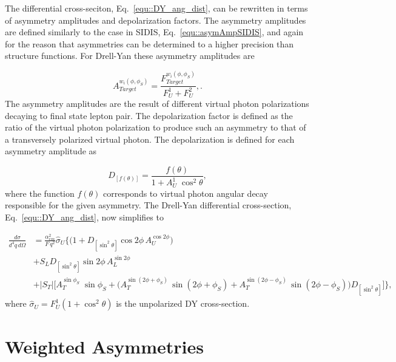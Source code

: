 The differential cross-seciton, Eq.~\ref{equ::DY_ang_dist}, can be rewritten in
terms of asymmetry amplitudes and depolarization factors.  The asymmetry
amplitudes are defined similarly to the case in SIDIS,
Eq.~\ref{equ::asymAmpSIDIS}, and again for the reason that asymmetries can be
determined to a higher precision than structure functions.  For Drell-Yan these
asymmetry amplitudes are

\begin{equation}
  A^{w_i(\phi, \phi_S)}_{Target} = \frac{F^{w_i(\phi,
      \phi_S)}_{Target}}{F_{U}^1+F_{U}^2},
  \label{equ::asymAmpDY}.
\end{equation}
\noindent
The asymmetry amplitudes are the result of different virtual photon
polarizations decaying to final state lepton pair.  The depolarization factor is
defined as the ratio of the virtual photon polarization to produce such an
asymmetry to that of a transversely polarized virtual photon.  The
depolarization is defined for each asymmetry amplitude as

\begin{equation}
  D_{[f(\theta)]} = \frac{f(\theta)}{1+A_U^1\;\cos^2\theta},
\end{equation}
\noindent
where the function $f(\theta)$ corresponds to virtual photon angular decay
responsible for the given asymmetry.  The Drell-Yan differential cross-section,
Eq.~\ref{equ::DY_ang_dist}, now simplifies to~\cite{AKotzininaNote}

\begin{align}
  \frac{d\sigma}{d^4 q \, d \Omega} &=
  \frac{\alpha_{em}^2}{F \, q^2}\hat{\sigma}_U
  \Big \{ \Big(1 + D_{[\sin^2 \theta]} \cos 2\phi \, A_{U}^{\cos 2\phi} \Big)
 \nonumber \\
 &+ S_{L} D_{[\sin^2 \theta]} \sin 2\phi \, A_{L}^{\sin 2\phi}
   \nonumber \\
   &+ |S_{T}|
   \Big[A_{T}^{\sin \phi_S}\;\sin \phi_{S} 
     + \Big( A_{T}^{\sin (2\phi +\phi_S)}\, \sin(2\phi+\phi_S) +
     A_{T}^{\sin (2\phi - \phi_S)}\, \sin(2\phi-\phi_S) \Big)D_{[\sin ^2\theta]}
     \Big ]
   \Big \},
\end{align}
\noindent
where $\hat{\sigma}_U = F^1_U (1+\cos^2\theta)$ is the unpolarized DY
cross-section.


\section{Weighted Asymmetries}
